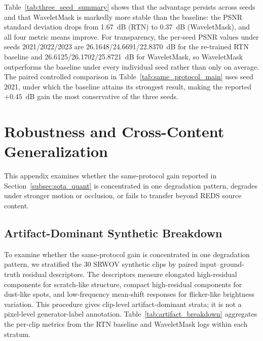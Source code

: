{Table~\ref{tab:three_seed_summary} shows that the advantage persists across seeds and that WaveletMask is markedly more stable than the baseline: the PSNR standard deviation drops from 1.67~dB (RTN) to 0.37~dB (WaveletMask), and all four metric means improve. For transparency, the per-seed PSNR values under seeds 2021/2022/2023 are 26.1648/24.6691/22.8370~dB for the re-trained RTN baseline and 26.6125/26.1702/25.8721~dB for WaveletMask, so WaveletMask outperforms the baseline under every individual seed rather than only on average. The paired controlled comparison in Table~\ref{tab:same_protocol_main} uses seed 2021, under which the baseline attains its strongest result, making the reported $+0.45$~dB gain the most conservative of the three seeds.


\section{Robustness and Cross-Content Generalization}\label{app:robustness}

This appendix examines whether the same-protocol gain reported in Section~\ref{subsec:sota_quant} is concentrated in one degradation pattern, degrades under stronger motion or occlusion, or fails to transfer beyond REDS source content.

\subsection{Artifact-Dominant Synthetic Breakdown}\label{subsec:artifact_breakdown}

To examine whether the same-protocol gain is concentrated in one degradation pattern, we stratified the 30 SRWOV synthetic clips by paired input--ground-truth residual descriptors. The descriptors measure elongated high-residual components for scratch-like structure, compact high-residual components for dust-like spots, and low-frequency mean-shift responses for flicker-like brightness variation. This procedure gives clip-level artifact-dominant strata; it is not a pixel-level generator-label annotation. Table~\ref{tab:artifact_breakdown} aggregates the per-clip metrics from the RTN baseline and WaveletMask logs within each stratum.

}

